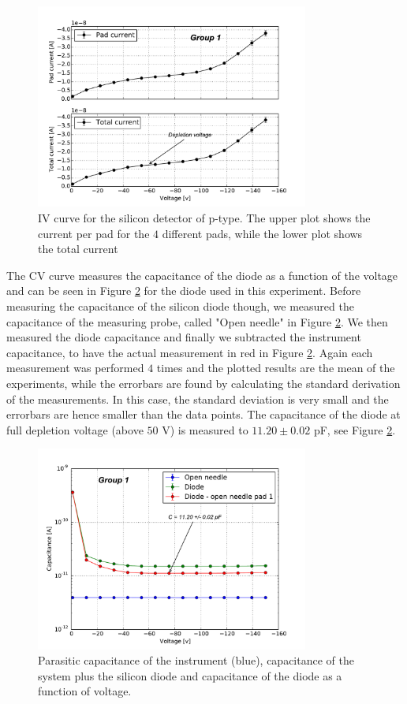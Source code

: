 \documentclass[12pt]{article}
\begin{document}
\begin{figure}[h!]
  \centering
  \includegraphics[width=0.8\textwidth]{./graphics/IV_V_vs_A.pdf}
  \caption{IV curve for the silicon detector of p-type. The upper plot shows the current per pad for the $4$ different pads, while the lower plot shows the total current }
  \label{fig:IVcurve}
\end{figure}

The CV curve measures the capacitance of the diode as a function of the voltage and can be seen in Figure \ref{fig:VC_curve_single} for the diode used in this experiment. Before measuring the capacitance of the silicon diode though, we measured the capacitance of the measuring probe, called "Open needle" in Figure \ref{fig:VC_curve_single}. We then measured the diode capacitance and finally we subtracted the instrument capacitance, to have the actual measurement in red in Figure \ref{fig:VC_curve_single}. Again each measurement was performed $4$ times and the plotted results are the mean of the experiments, while the errorbars are found by calculating the standard derivation of the measurements. In this case, the standard deviation is very small and the errorbars are hence smaller than the data points. The capacitance of the diode at full depletion voltage (above $50$ V) is measured to $11.20 \pm 0.02$ pF, see Figure \ref{fig:VC_curve_single}.

\begin{figure}[t!]
  \centering
  \includegraphics[width=0.8\textwidth]{./graphics/V_vs_C}
  \caption{Parasitic capacitance of the instrument (blue), capacitance of the system plus the silicon diode and capacitance of the diode as a function of voltage.}
  \label{fig:VC_curve_single}
\end{figure}
\end{document}
